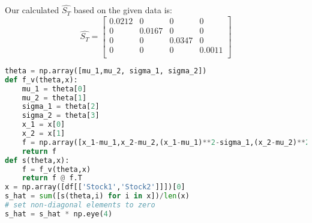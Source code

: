 \begin{enumerate}[(a)]
Our calculated $\hat{S_T}$ based on the given data is:
\begin{equation*}
  \hat{S_T} = \begin{bmatrix}
    0.0212 & 0 & 0 & 0\\
    0 & 0.0167 & 0 & 0\\
    0 & 0 & 0.0347 & 0 \\
    0 & 0 & 0 & 0.0011 \\
  \end{bmatrix}
\end{equation*}
\begin{lstlisting}[language=Python, caption=Python function for calculating standard error of estimation , label={lst:q1a}, escapechar=|, frame=single, basicstyle=\small, showstringspaces=false, captionpos=b, breaklines=true, showspaces=false, showtabs=false, keywordstyle=\color{blue}, commentstyle=\color{gray}]
theta = np.array([mu_1,mu_2, sigma_1, sigma_2])
def f_v(theta,x):
    mu_1 = theta[0]
    mu_2 = theta[1]
    sigma_1 = theta[2]
    sigma_2 = theta[3]
    x_1 = x[0]
    x_2 = x[1]
    f = np.array([x_1-mu_1,x_2-mu_2,(x_1-mu_1)**2-sigma_1,(x_2-mu_2)**2-sigma_2]).reshape(len(theta),1)
    return f
def s(theta,x):
    f = f_v(theta,x)
    return f @ f.T
x = np.array([df[['Stock1','Stock2']]])[0]
s_hat = sum([s(theta,i) for i in x])/len(x)
# set non-diagonal elements to zero
s_hat = s_hat * np.eye(4)
\end{lstlisting}




\end{enumerate}
